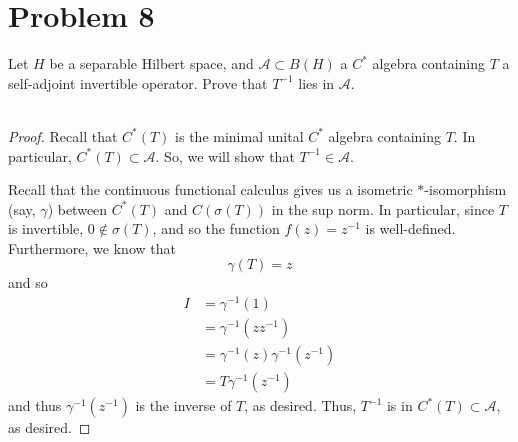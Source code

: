 \documentclass[fontsize=11pt]{scrartcl} %
\numberwithin{equation}{section} %
\numberwithin{figure}{section} %
\numberwithin{table}{section} %
\begin{document}
\section*{Problem 8}
Let $H$ be a separable Hilbert space, and $\mathscr{A}\subset B(H)$ a $C^*$
algebra containing $T$ a self-adjoint invertible operator. Prove that $T^{-1}$
lies in $\mathscr{A}$.
\\
\\
\begin{proof}
    Recall that $C^*(T)$ is the minimal unital $C^*$ algebra containing $T$.
    In particular, $C^*(T)\subset \mathscr{A}$. So, we will show that
    $T^{-1}\in\mathscr{A}$.

    Recall that the continuous functional calculus gives us a isometric
    $*$-isomorphism (say, $\gamma$) between $C^*(T)$ and $C(\sigma(T))$ in the
    sup norm. In particular, since $T$ is invertible, $0\not\in\sigma(T)$, and
    so the function $f(z) = z^{-1}$ is well-defined. Furthermore, we know that
    \[
        \gamma(T)=z
    \]
    and so
    \[
\begin{aligned}
    I &= \gamma^{-1}(1)\\
    &= \gamma^{-1}(zz^{-1})\\
    &= \gamma^{-1}(z)\gamma^{-1}(z^{-1})\\
    &= T\gamma^{-1}(z^{-1})
\end{aligned}
    \]
    and thus $\gamma^{-1}(z^{-1})$ is the inverse of $T$, as desired. Thus,
    $T^{-1}$ is in $C^*(T)\subset\mathscr{A}$, as desired.
\end{proof}
\end{document}
